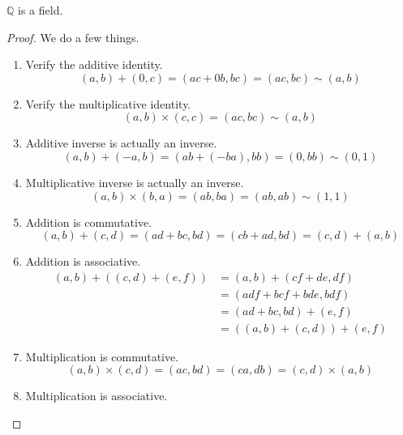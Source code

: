   \begin{theorem}
    $\mathbb{Q}$ is a field. 
  \end{theorem}
  \begin{proof}
    We do a few things. 
    \begin{enumerate}
      \item Verify the additive identity. 
      \begin{equation}
        (a, b) + (0, c) = (ac + 0b, bc) = (ac, bc) \sim (a, b)
      \end{equation}
      \item Verify the multiplicative identity. 
      \begin{equation}
        (a, b) \times (c, c) = (ac, bc) \sim (a, b)
      \end{equation}
      \item Additive inverse is actually an inverse. 
      \begin{equation}
        (a, b) + (-a, b) = (ab + (-ba), bb) = (0, bb) \sim (0, 1)
      \end{equation}
      \item Multiplicative inverse is actually an inverse. 
      \begin{equation}
        (a, b) \times (b, a) = (ab, ba) = (ab, ab) \sim (1, 1)
      \end{equation}
      \item Addition is commutative. 
      \begin{equation}
        (a, b) + (c, d) = (ad + bc, bd) = (cb + ad, bd) = (c, d) + (a, b)
      \end{equation}
      \item Addition is associative. 
      \begin{align}
        (a, b) + ((c, d) + (e, f)) & = (a, b) + (cf + de, df) \\
                                   & = (adf + bcf + bde, bdf) \\
                                   & = (ad + bc, bd) + (e, f) \\
                                   & = ((a, b) + (c, d)) + (e, f)
      \end{align}
      \item Multiplication is commutative. 
      \begin{equation}
        (a, b) \times (c, d) = (ac, bd) = (ca, db) = (c, d) \times (a, b)
      \end{equation}
      \item Multiplication is associative. 

\end{enumerate}
\end{proof}
